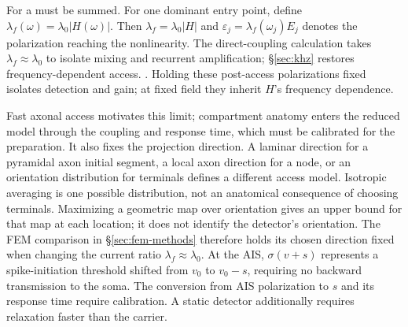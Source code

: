 \documentclass[11pt,a4paper]{article}
\newcommand{\Sig}{\sigma}
\providecommand{\DIFaddtex}[1]{{\protect\color{blue} \sf #1}} %
\providecommand{\DIFdeltex}[1]{{\protect\color{red} \scriptsize #1}} %
\providecommand{\DIFaddbegin}{} %
\providecommand{\DIFaddend}{} %
\providecommand{\DIFdelbegin}{} %
\providecommand{\DIFdelend}{} %
\providecommand{\DIFadd}[1]{\texorpdfstring{\DIFaddtex{#1}}{#1}} %
\providecommand{\DIFdel}[1]{\texorpdfstring{\DIFdeltex{#1}}{}} %
\begin{document}
\DIFdel{For a }\DIFdelend \DIFaddbegin \DIFadd{must be summed. For one }\DIFaddend dominant entry point,
\DIFdelbegin \DIFdel{define $\lambda_f(\omega)=\lambda_0|H(\omega)|$.
Then }\DIFdelend \DIFaddbegin \DIFadd{$\lambda_f=\lambda_0|H|$ and }\DIFaddend $\varepsilon_j=\lambda_f(\omega_j)E_j$\DIFdelbegin \DIFdel{denotes the
polarization reaching the nonlinearity.
The direct-coupling calculation takes
$\lambda_f\approx\lambda_0$ to isolate mixing and recurrent amplification;
\S\ref{sec:khz} restores frequency-dependent access.
}\DIFdelend \DIFaddbegin \DIFadd{.
Holding these post-access polarizations fixed isolates detection and gain;
at fixed field they inherit $H$'s frequency dependence.
}

\DIFaddend Fast axonal access motivates \DIFdelbegin \DIFdel{this limit; compartment anatomy enters the reduced model through
the coupling and response time, which must be calibrated for the preparation. It also fixes the projection direction. A laminar direction for a pyramidal
axon initial segment,
a local axon direction for a node, or an orientation
distribution for terminals defines a different access model. Isotropic averaging
is one possible distribution, not an anatomical consequence of choosing terminals.
Maximizing a geometric map over orientation gives an upper bound for that map
at each location; it does not identify the detector's orientation. The FEM
comparison in \S\ref{sec:fem-methods} therefore holds its chosen direction fixed
when changing the current ratio}\DIFdelend \DIFaddbegin \DIFadd{$\lambda_f\approx\lambda_0$. At the AIS,
$\Sig(v+s)$ represents a spike-initiation threshold shifted from $v_0$ to
$v_0-s$, requiring no backward transmission to the soma. The conversion from
AIS polarization to $s$ and its response time require calibration. A static
detector additionally requires relaxation faster than the carrier}\DIFaddend .
\end{document}

